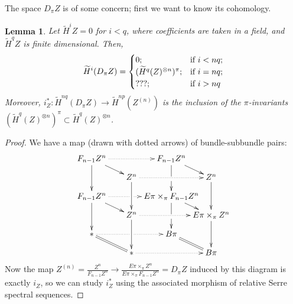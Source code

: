 \documentclass{article}
\renewcommand{\to}{\longrightarrow}
\newtheorem{lem}[thm]{Lemma}
\theoremstyle{definition}
\begin{document}
 

The space $D_\pi Z$ is of some concern; first we want to know its cohomology.
\begin{lem}
Let $\widetilde H^i Z = 0$ for $i < q$, where coefficients are taken in a field, and $\widetilde H^q Z$ is finite dimensional.  Then,
\[\widetilde H^i(D_\pi Z)=
\begin{cases}0;&\textup{if }i<nq;\\(\widetilde H^q(Z)^{\otimes n})^\pi;&\textup{if }i=nq;\\???;&\textup{if }i>nq\end{cases}
\]
Moreover, $i_Z^*:\widetilde H^{nq}(D_\pi Z)\to \widetilde H^{np}(Z^{(n)})$ is the inclusion of the $\pi$-invariants $(\widetilde H^q(Z)^{\otimes n})^\pi\subset\widetilde H^q(Z)^{\otimes n}$.
\end{lem}
\begin{proof}
We have a map (drawn with dotted arrows) of bundle-subbundle pairs:
\[\xymatrix@!0@C=1.7cm@R=.8cm{
F_{n-1}Z^n\ar[dd]\ar[rd]\ar@{.>}[rr]&&F_{n-1}Z^n\ar'[d][dd]\ar[rd]\\
&Z^n\ar[dd]\ar@{.>}[rr]&&\ar[dd]Z^n\\
F_{n-1}Z^n\ar[dd]\ar[rd]\ar@{.>}'[r][rr]&&E\pi\times_\pi F_{n-1}Z^n\ar'[d][dd]\ar[rd]\\
&Z^n\ar[dd]\ar@{.>}[rr]&&\ar[dd]E\pi\times_\pi Z^n\\
\ast\ar@{.>}'[r][rr]\ar@{=}[rd]&&B\pi\ar@{=}[rd]\\
&\ast\ar@{.>}[rr]&&B\pi
}\]
Now the map $Z^{(n)}=\frac{Z^n}{F_{n-1}Z^n}\longrightarrow\frac{E\pi \times_\pi Z^n}{E\pi \times_\pi F_{n-1}Z^n} = D_\pi Z$ induced by this diagram is exactly $i_Z$, so we can study $i^*_Z$ using the associated morphism of relative Serre spectral sequences.


\end{proof}
\end{document}
